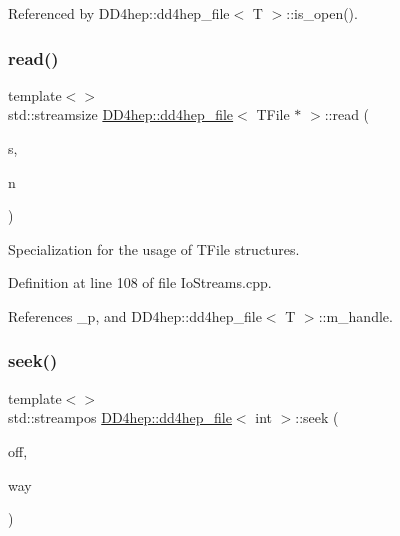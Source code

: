Referenced by D\+D4hep\+::dd4hep\+\_\+file$<$ T $>$\+::is\+\_\+open().

\hypertarget{class_d_d4hep_1_1dd4hep__file_a215a98857667d16d6def78858cd26e42}{}\label{class_d_d4hep_1_1dd4hep__file_a215a98857667d16d6def78858cd26e42} 
\subsubsection{\texorpdfstring{read()}{read()}\hspace{0.1cm}{\footnotesize\ttfamily [3/3]}}
{\footnotesize\ttfamily template$<$$>$ \\
std\+::streamsize \hyperlink{class_d_d4hep_1_1dd4hep__file}{D\+D4hep\+::dd4hep\+\_\+file}$<$ T\+File $\ast$ $>$\+::read (\begin{DoxyParamCaption}\item[{\hyperlink{class_d_d4hep_1_1dd4hep__file_aef4242f7f2fe15a59f7bf7a8f6ba24d5}{char\+\_\+type} $\ast$}]{s,  }\item[{std\+::streamsize}]{n }\end{DoxyParamCaption})}



Specialization for the usage of T\+File structures. 



Definition at line 108 of file Io\+Streams.\+cpp.



References \+\_\+p, and D\+D4hep\+::dd4hep\+\_\+file$<$ T $>$\+::m\+\_\+handle.

\hypertarget{class_d_d4hep_1_1dd4hep__file_a13e0c4c08c5b6c0968df3d254853933e}{}\label{class_d_d4hep_1_1dd4hep__file_a13e0c4c08c5b6c0968df3d254853933e} 
\subsubsection{\texorpdfstring{seek()}{seek()}\hspace{0.1cm}{\footnotesize\ttfamily [1/3]}}
{\footnotesize\ttfamily template$<$$>$ \\
std\+::streampos \hyperlink{class_d_d4hep_1_1dd4hep__file}{D\+D4hep\+::dd4hep\+\_\+file}$<$ int $>$\+::seek (\begin{DoxyParamCaption}\item[{\hyperlink{class_d_d4hep_1_1dd4hep__file_a28e1531542193871075e8b7f47818113}{stream\+\_\+offset}}]{off,  }\item[{B\+O\+O\+S\+T\+\_\+\+I\+O\+S\+::seekdir}]{way }\end{DoxyParamCaption})}



